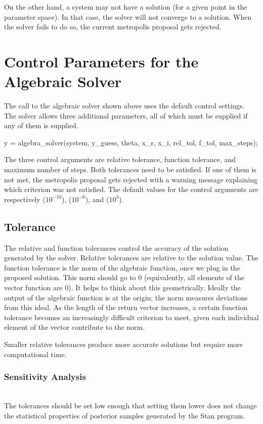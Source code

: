 On the other hand, a system may not have a solution (for a given point in the parameter
space). In that case, the solver will not converge to a solution. When the solver fails to
do so, the current metropolis proposal gets rejected.

\section{Control Parameters for the Algebraic Solver}\label{algebra-control.section}
%
The call to the algebraic solver shown above uses the default control settings. The solver
allows three additional parameters, all of which must be supplied if any of them is
supplied.
%
\begin{stancode}
  y = algebra_solver(system, y_guess, theta, x_r, x_i,
                     rel_tol, f_tol, max_steps);
\end{stancode}

The three control arguments are relative tolerance, function tolerance, and maximum
number of steps. Both tolerances need to be satisfied. If one of them is not met, the
metropolis proposal gets rejected with a warning message explaining which criterion
was not satisfied. The default values for the control arguments are respectively
 ($10^{-10}$),  ($10^{-6}$), and  ($10^3$).

\subsection{Tolerance}
%
The relative and function tolerances control the accuracy of the solution generated by
the solver. Relative tolerances are relative to the solution value. The function tolerance
is the norm of the algebraic function, once we plug in the proposed solution. This norm
should go to 0 (equivalently, all elements of the vector function are 0). It helps to think about this
geometrically. Ideally the output of the algebraic function is at the origin; the norm measures
deviations from this ideal. As the length of the return vector increases, a certain
function tolerance becomes an increasingly difficult criterion to meet, given each
individual element of the vector contribute to the norm.

Smaller relative tolerances produce more accurate solutions but require more computational time.

\subsubsection{Sensitivity Analysis} \ \\
The tolerances should be set low enough that setting them lower does not change the
statistical properties of posterior samples generated by the Stan program.

